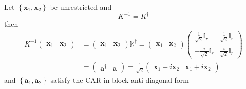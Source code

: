 \documentclass[aps, preprint]{revtex4}
\begin{document}
Let $\left \{\mathbf{x}_{1} ,\mathbf{x}_{2}\right \}$ be unrestricted and
\begin{equation}K^{ -1} =K^{ \dag }
\end{equation}then
\begin{align}K^{ -1} \left (\begin{array}{cc}\mathbf{x}_{1} & \mathbf{x}_{2}\end{array}\right ) &  =\left (\begin{array}{cc}\mathbf{x}_{1} & \mathbf{x}_{2}\end{array}\right ) \mathbb{K}^{ \dag } =\left (\begin{array}{cc}\mathbf{x}_{1} & \mathbf{x}_{2}\end{array}\right ) \left (\begin{array}{cc}\frac{1}{\sqrt{2}} \mathbb{I}_{r} & \frac{1}{\sqrt{2}} \mathbb{I}_{r} \\
 -\frac{i}{\sqrt{2}} \mathbb{I}_{r} & \frac{i}{\sqrt{2}} \mathbb{I}_{r}\end{array}\right ) \\
 &  =\left (\begin{array}{cc}\mathbf{a}^{ \dag } & \mathbf{a}\end{array}\right ) =\frac{1}{\sqrt{2}} \left (\begin{array}{cc}\mathbf{x}_{1} -i \mathbf{x}_{2} & \mathbf{x}_{1} +i \mathbf{x}_{2}\end{array}\right )\end{align}and $\left \{\mathbf{a}_{1} ,\mathbf{a}_{2}\right \}$ satisfy the CAR in block anti diagonal form
\end{document}
